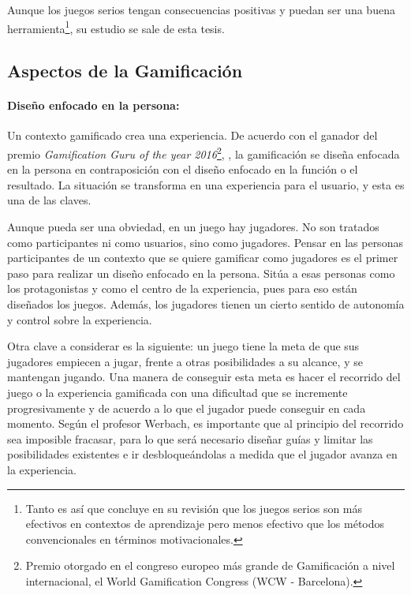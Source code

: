 Aunque los juegos serios tengan consecuencias positivas y puedan ser una buena herramienta\footnote{Tanto es así que \cite{MetaSerious} concluye en su revisión que los juegos serios son más efectivos en contextos de aprendizaje pero menos efectivo que los métodos convencionales en términos motivacionales.}, su estudio se sale de esta tesis.

\subsection{Aspectos de la Gamificación}

\paragraph{Diseño enfocado en la persona:} 
Un contexto gamificado crea una experiencia.
%
De acuerdo con el ganador del premio \textit{Gamification Guru of the year 2016}\footnote{Premio otorgado en el congreso europeo más grande de Gamificación a nivel internacional, el World Gamification Congress (WCW - Barcelona).}, \cite{BeyondPBL}, la gamificación se diseña enfocada en la persona en contraposición con el diseño enfocado en la función o el resultado.
%
La situación se transforma en una experiencia para el usuario, y esta es una de las claves.

Aunque pueda ser una obviedad, en un juego hay jugadores. 
%
No son tratados como participantes ni como usuarios, sino como jugadores.
%
Pensar en las personas participantes de un contexto que se quiere gamificar como jugadores es el primer paso para realizar un diseño enfocado en la persona.
%
Sitúa a esas personas como los protagonistas y como el centro de la experiencia, pues para eso están diseñados los juegos.
%
Además, los jugadores tienen un cierto sentido de autonomía y control sobre la experiencia.

Otra clave a considerar es la siguiente: un juego tiene la meta de que sus jugadores empiecen a jugar, frente a otras posibilidades a su alcance, y se mantengan jugando.
%
Una manera de conseguir esta meta es hacer el recorrido del juego o la experiencia gamificada con una dificultad que se incremente progresivamente y de acuerdo a lo que el jugador puede conseguir en cada momento. 
%
Según el profesor Werbach, es importante que al principio del recorrido sea imposible fracasar, para lo que será necesario diseñar guías y limitar las posibilidades existentes e ir desbloqueándolas a medida que el jugador avanza en la experiencia.


